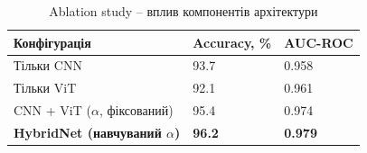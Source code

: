 \begin{table}[H]
  \caption{Ablation study -- вплив компонентів архітектури}
  \label{tbl:ablation}
  \centering
  \begin{tabularx}{\linewidth}{|Y|Y|Y|}
    \hline
    \textbf{Конфігурація} & \textbf{Accuracy, \%} & \textbf{AUC-ROC} \\ \hline
    Тільки CNN                                      & 93.7          & 0.958          \\ \hline
    Тільки ViT                                      & 92.1          & 0.961          \\ \hline
    CNN + ViT ($\alpha$, фіксований)                & 95.4          & 0.974          \\ \hline
    \textbf{HybridNet (навчуваний $\alpha$)}        & \textbf{96.2} & \textbf{0.979} \\ \hline
  \end{tabularx}
\end{table}
